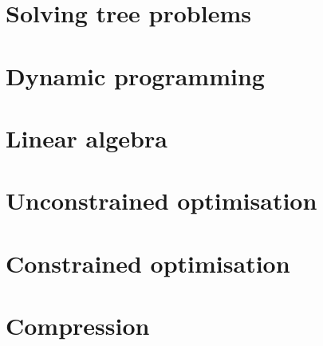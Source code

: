 \documentclass[oneside]{book}
\begin{document}
\part{Solving tree problems}







\part{Dynamic programming}




\part{Linear algebra}









\part{Unconstrained optimisation}





\part{Constrained optimisation}


\part{Compression}

\end{document}
